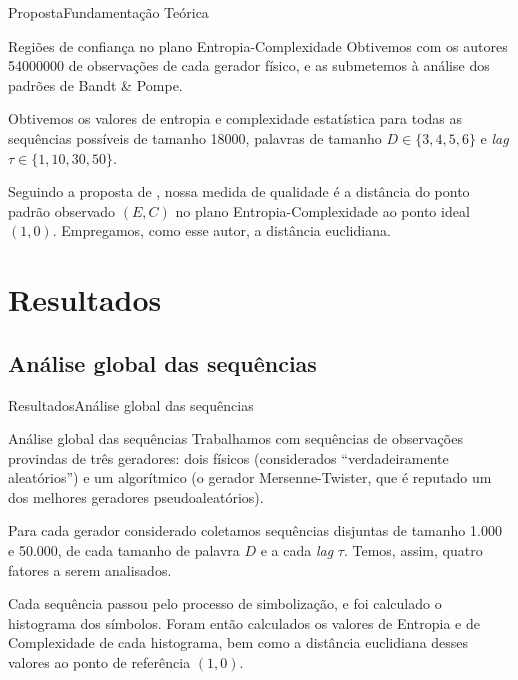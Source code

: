 \documentclass[10pt,xcolor={dvipsnames}]{beamer}
\begin{document}
\begin{frame}{Proposta}{Fundamentação Teórica}
	\begin{block}{Regiões de confiança no plano Entropia-Complexidade}
	Obtivemos com os autores \num{54000000} de observações de cada gerador físico, e as submetemos à análise dos padrões de Bandt \& Pompe.
	
	Obtivemos os valores de entropia e complexidade estatística para todas as sequências possíveis de tamanho \num{18000}, palavras de tamanho $D\in\{3, 4, 5, 6\}$ e \textit{lag} $\tau\in\{1, 10, 30,50\}$.
	
	Seguindo a proposta de \cite{NewPermutationEntropy}, nossa medida de qualidade é a distância do ponto padrão observado $(E,C)$ no plano Entropia-Complexidade ao ponto ideal $(1,0)$.
	Empregamos, como esse autor, a distância euclidiana.
	\end{block}
\end{frame}
\section{Resultados}
\subsection{Análise global das sequências}
\begin{frame}{Resultados}{Análise global das sequências}
  \begin{block}{Análise global das sequências}
	Trabalhamos com sequências de observações provindas de três geradores: dois físicos (considerados ``verdadeiramente aleatórios'') e um algorítmico (o gerador Mersenne-Twister, que é reputado um dos melhores geradores pseudoaleatórios).
	\pause
	
	Para cada gerador considerado coletamos sequências disjuntas de tamanho \num{1.000} e \num{50.000}, de cada tamanho de palavra $D$ e a cada \textit{lag} $\tau$.
	Temos, assim, quatro fatores a serem analisados.
	\pause
	
	Cada sequência passou pelo processo de simbolização, e foi calculado o histograma dos símbolos.
	Foram então calculados os valores de Entropia e de Complexidade de cada histograma, bem como a distância euclidiana desses valores ao ponto de referência $(1,0)$.
  \end{block}
\end{frame}
\end{document}

